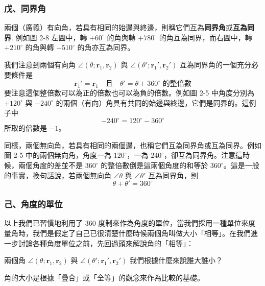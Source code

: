 \subsubsection*{戊、同界角}

兩個（廣義）有向角，若具有相同的始邊與終邊，則稱它們互為\textbf{同界角}或\textbf{互為同界}. 例如圖 2-8 左圖中，轉 $+60^\circ$ 的角與轉 $+780^\circ$ 的角互為同界，而右圖中，轉 $+210^\circ$ 的角與轉 $-510^\circ$ 的角亦互為同界。

我們注意到兩個有向角 $\angle(\theta; \mathbf{r}_1, \mathbf{r}_2)$ 與 $\angle(\theta'; \mathbf{r}_1', \mathbf{r}_2')$ 互為同界角的一個充分必要條件是
\[ \mathbf{r}_1' = \mathbf{r}_1 \quad\text{且}\quad \theta' = \theta + 360^\circ \text{ 的整倍數} \]
要注意這個整倍數可以為正的倍數也可以為負的倍數。例如圖 2-5 中角度分別為 $+120^\circ$ 與 $-240^\circ$ 的兩個（有向）角具有共同的始邊與終邊，它們是同界的。這例子中
\[ -240^\circ = 120^\circ - 360^\circ \]
所取的倍數是 $-1$。

同樣，兩個無向角，若具有相同的兩個邊，也稱它們互為同界角或互為同界。例如圖 2-5 中的兩個無向角，角度一為 $120^\circ$，一為 $240^\circ$，卻互為同界角。注意這時候，兩個角度的差並不是 $360^\circ$ 的整倍數倒是這兩個角度的和等於 $360^\circ$。這是一般的事實，換句話說，若兩個無向角 $\angle\theta$ 與 $\angle\theta'$ 互為同界角，則
\[ \theta + \theta' = 360^\circ \]

\subsubsection*{己、角度的單位}

以上我們已習慣地利用了 360 度制來作為角度的單位，當我們採用一種單位來度量角時，我們是假定了自己已很清楚什麼時候兩個角叫做大小「相等」。在我們進一步討論各種角度單位之前，先回過頭來解說角的「相等」：

兩個角 $\angle(\theta; \mathbf{r}_1, \mathbf{r}_2)$ 與 $\angle(\theta'; \mathbf{r}_1', \mathbf{r}_2')$ 我們根據什麼來說誰大誰小？

角的大小是根據「疊合」或「全等」的觀念來作為比較的基礎。

